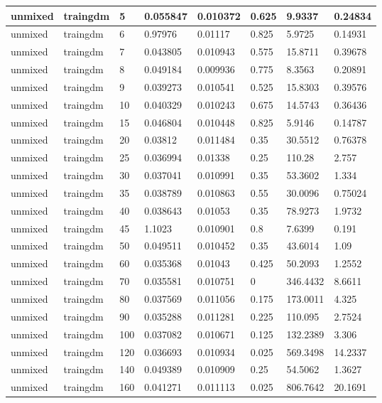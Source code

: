 \begin{longtable}{llllllll}
unmixed & traingdm & 5 & 0.055847 & 0.010372 & 0.625 & 9.9337 & 0.24834 \\ \hline 
unmixed & traingdm & 6 & 0.97976 & 0.01117 & 0.825 & 5.9725 & 0.14931 \\ \hline 
unmixed & traingdm & 7 & 0.043805 & 0.010943 & 0.575 & 15.8711 & 0.39678 \\ \hline 
unmixed & traingdm & 8 & 0.049184 & 0.009936 & 0.775 & 8.3563 & 0.20891 \\ \hline 
unmixed & traingdm & 9 & 0.039273 & 0.010541 & 0.525 & 15.8303 & 0.39576 \\ \hline 
unmixed & traingdm & 10 & 0.040329 & 0.010243 & 0.675 & 14.5743 & 0.36436 \\ \hline 
unmixed & traingdm & 15 & 0.046804 & 0.010448 & 0.825 & 5.9146 & 0.14787 \\ \hline 
unmixed & traingdm & 20 & 0.03812 & 0.011484 & 0.35 & 30.5512 & 0.76378 \\ \hline 
unmixed & traingdm & 25 & 0.036994 & 0.01338 & 0.25 & 110.28 & 2.757 \\ \hline 
unmixed & traingdm & 30 & 0.037041 & 0.010991 & 0.35 & 53.3602 & 1.334 \\ \hline 
unmixed & traingdm & 35 & 0.038789 & 0.010863 & 0.55 & 30.0096 & 0.75024 \\ \hline 
unmixed & traingdm & 40 & 0.038643 & 0.01053 & 0.35 & 78.9273 & 1.9732 \\ \hline 
unmixed & traingdm & 45 & 1.1023 & 0.010901 & 0.8 & 7.6399 & 0.191 \\ \hline 
unmixed & traingdm & 50 & 0.049511 & 0.010452 & 0.35 & 43.6014 & 1.09 \\ \hline 
unmixed & traingdm & 60 & 0.035368 & 0.01043 & 0.425 & 50.2093 & 1.2552 \\ \hline 
unmixed & traingdm & 70 & 0.035581 & 0.010751 & 0 & 346.4432 & 8.6611 \\ \hline 
unmixed & traingdm & 80 & 0.037569 & 0.011056 & 0.175 & 173.0011 & 4.325 \\ \hline 
unmixed & traingdm & 90 & 0.035288 & 0.011281 & 0.225 & 110.095 & 2.7524 \\ \hline 
unmixed & traingdm & 100 & 0.037082 & 0.010671 & 0.125 & 132.2389 & 3.306 \\ \hline 
unmixed & traingdm & 120 & 0.036693 & 0.010934 & 0.025 & 569.3498 & 14.2337 \\ \hline 
unmixed & traingdm & 140 & 0.049389 & 0.010909 & 0.25 & 54.5062 & 1.3627 \\ \hline 
unmixed & traingdm & 160 & 0.041271 & 0.011113 & 0.025 & 806.7642 & 20.1691 \\ \hline 

\end{longtable}

